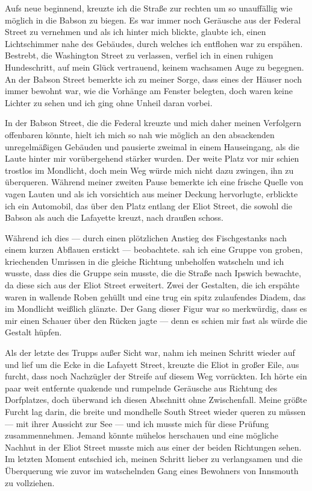 Aufs neue beginnend, kreuzte ich die Straße zur rechten um so unauffällig wie möglich in die Babson zu biegen. Es war immer noch Geräusche aus der Federal Street zu vernehmen und als ich hinter mich blickte, glaubte ich, einen Lichtschimmer nahe des Gebäudes, durch welches ich entflohen war zu erspähen. Bestrebt, die Washington Street zu verlassen, verfiel ich in einen ruhigen Hundeschritt, auf mein Glück vertrauend, keinem wachsamen Auge zu begegnen. An der Babson Street bemerkte ich zu meiner Sorge, dass eines der Häuser noch immer bewohnt war, wie die Vorhänge am Fenster belegten, doch waren keine Lichter zu sehen und ich ging ohne Unheil daran vorbei.

In der Babson Street, die die Federal kreuzte und mich daher meinen Verfolgern offenbaren könnte, hielt ich mich so nah wie möglich an den absackenden unregelmäßigen Gebäuden und pausierte zweimal in einem Hauseingang, als die Laute hinter mir vorübergehend stärker wurden. Der weite Platz vor mir schien trostlos im Mondlicht, doch mein Weg würde mich nicht dazu zwingen, ihn zu überqueren. Während meiner zweiten Pause bemerkte ich eine frische Quelle von vagen Lauten und als ich vorsichtich aus meiner Deckung hervorlugte, erblickte ich ein Automobil, das über den Platz entlang der Eliot Street, die sowohl die Babson als auch die Lafayette kreuzt, nach draußen schoss.

Während ich dies --- durch einen plötzlichen Anstieg des Fischgestanks nach einem kurzen Abflauen erstickt --- beobachtete. sah ich eine Gruppe von groben, kriechenden Umrissen in die gleiche Richtung unbeholfen watscheln und ich wusste, dass dies die Gruppe sein musste, die die Straße nach Ipswich bewachte, da diese sich aus der Eliot Street erweitert. Zwei der Gestalten, die ich erspähte waren in wallende Roben gehüllt und eine trug ein spitz zulaufendes Diadem, das im Mondlicht weißlich glänzte. Der Gang dieser Figur war so merkwürdig, dass es mir einen Schauer über den Rücken jagte --- denn es schien mir fast als würde die Gestalt hüpfen.

Als der letzte des Trupps außer Sicht war, nahm ich meinen Schritt wieder auf und lief um die Ecke in die Lafayett Street, kreuzte die Eliot in großer Eile, aus furcht, dass noch Nachzügler der Streife auf diesem Weg vorrückten. Ich hörte ein paar weit entfernte quakende und rumpelnde Geräusche aus Richtung des Dorfplatzes, doch überwand ich diesen Abschnitt ohne Zwischenfall. Meine größte Furcht lag darin, die breite und mondhelle South Street wieder queren zu müssen --- mit ihrer Aussicht zur See --- und ich musste mich für diese Prüfung zusammennehmen. Jemand könnte mühelos herschauen und eine mögliche Nachhut in der Eliot Street musste mich aus einer der beiden Richtungen sehen. Im letzten Moment entschied ich, meinen Schritt lieber zu verlangsamen und die Überquerung wie zuvor im watschelnden Gang eines Bewohners von Innsmouth zu vollziehen.

